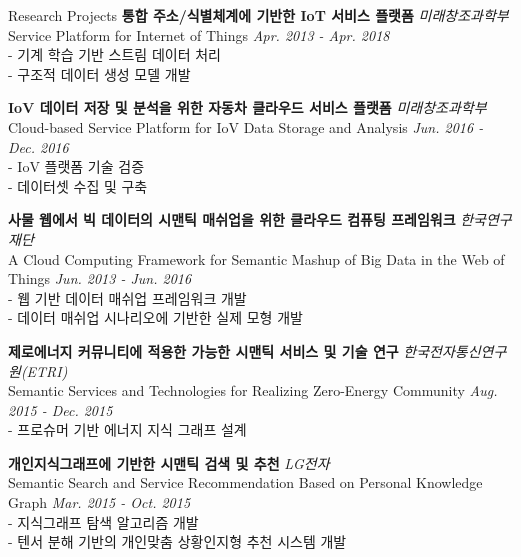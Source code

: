 \documentclass{resume} %
\begin{document}
\begin{rSection}{Research Projects}
		\textbf{통합 주소/식별체계에 기반한 IoT 서비스 플랫폼} \hfill {\small\em 미래창조과학부}\\
		{\small Service Platform for Internet of Things} \hfill {\small\em Apr. 2013 - Apr. 2018}
		\vspace{0.1em}\\
		- 기계 학습 기반 스트림 데이터 처리\\
		- 구조적 데이터 생성 모델 개발
		\vspace{0.2em}
		
		\textbf{IoV 데이터 저장 및 분석을 위한 자동차 클라우드 서비스 플랫폼} \hfill {\small\em 미래창조과학부}\\
		{\small Cloud-based Service Platform for IoV Data Storage and Analysis} \hfill {\small\em Jun. 2016 - Dec. 2016}
		\vspace{0.1em}\\
		- IoV 플랫폼 기술 검증\\
		- 데이터셋 수집 및 구축
		\vspace{0.2em}
		
		\textbf{사물 웹에서 빅 데이터의 시맨틱 매쉬업을 위한 클라우드 컴퓨팅 프레임워크} \hfill {\small\em 한국연구재단}\\
		{\small A Cloud Computing Framework for Semantic Mashup of Big Data in the Web of Things} \hfill {\small\em Jun. 2013 - Jun. 2016}
		\vspace{0.1em}\\
		- 웹 기반 데이터 매쉬업 프레임워크 개발\\
		- 데이터 매쉬업 시나리오에 기반한 실제 모형 개발
		\vspace{0.2em}
		
		\textbf{제로에너지 커뮤니티에 적용한 가능한 시맨틱 서비스 및 기술 연구} \hfill {\small\em 한국전자통신연구원(ETRI)}\\
		{\small Semantic Services and Technologies for Realizing Zero-Energy Community} \hfill {\small\em Aug. 2015 - Dec. 2015}
		\vspace{0.1em}\\
		- 프로슈머 기반 에너지 지식 그래프 설계
		\vspace{0.2em}
		
		\textbf{개인지식그래프에 기반한 시맨틱 검색 및 추천} \hfill {\small\em LG전자}\\
		{\small Semantic Search and Service Recommendation Based on Personal Knowledge Graph} \hfill {\small\em Mar. 2015 - Oct. 2015}
		\vspace{0.1em}\\
		- 지식그래프 탐색 알고리즘 개발\\
		- 텐서 분해 기반의 개인맞춤 상황인지형 추천 시스템 개발
	\end{rSection}
\end{document}
